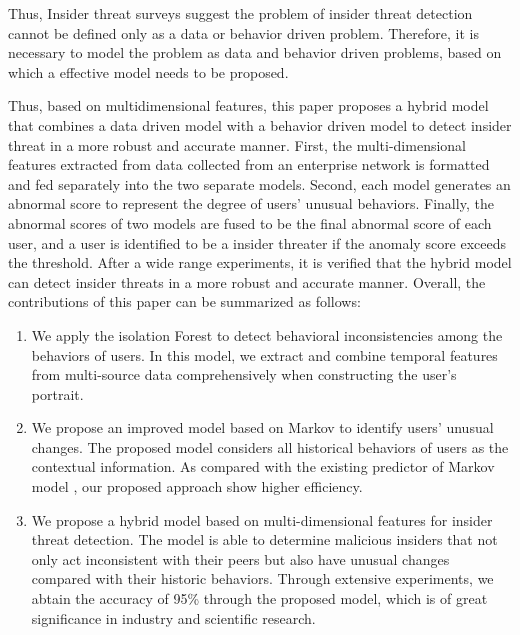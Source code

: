 \documentclass[conference]{IEEEtran}
\begin{document}
Thus, Insider threat surveys\cite{b9} suggest the problem of insider threat detection cannot be defined only as a data or behavior driven problem. Therefore, it is necessary to model the problem as data and behavior driven problems, based on which a effective model needs to be proposed.

Thus, based on multidimensional features, this paper proposes a hybrid model that combines a data driven model with a behavior driven model to detect insider threat in a more robust and accurate manner.
First, the multi-dimensional features extracted from data collected  from an enterprise network is formatted and fed separately into the two separate models. Second, each model generates an abnormal score to represent the degree of users' unusual behaviors. Finally, the abnormal scores of two models are fused to be the final abnormal score of each user, and a user is identified to be a insider threater if the anomaly score exceeds the threshold. 
After a wide range experiments, it is 
verified that the hybrid model can detect insider threats in a more robust and accurate manner.
Overall, the contributions of this paper can be summarized as follows:


\begin{enumerate}
\item 
We apply the isolation Forest to detect behavioral inconsistencies among the behaviors of users. In this model, we extract and combine temporal features from multi-source data comprehensively when constructing the user's portrait.

\item We propose an improved model based on Markov to identify users' unusual changes. The proposed model considers all historical behaviors of users as the contextual information. As compared with the existing predictor of Markov model \cite{b10}, our proposed approach show higher efficiency.

\item We propose a hybrid model based on multi-dimensional features for insider threat detection. The model is able to determine malicious insiders that not only act inconsistent with their peers but also have unusual changes compared with their historic behaviors. 
Through extensive experiments, we abtain the accuracy of 95\% through the proposed model, which is of great significance in industry and scientific research.
 


\end{enumerate}
\end{document}
